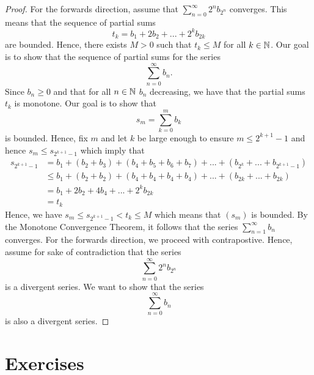 \begin{proof}
    For the forwards direction, assume that \( \sum_{n=0}^{ \infty} 2^n b_{2^n}\) converges. This means that the sequence of partial sums 
    \[ t_k = b_1 + 2b_2 + ... + 2^k b_{2k}\] are bounded. Hence, there exists \( M > 0 \) such that \( t_k \leq M \) for all \( k \in \mathbb{N} \). Our goal is to show that the sequence of partial sums for the series 
    \[ \sum_{n=0}^{ \infty} b_n.\] 
     Since \( b_n \geq 0 \) and that for all \( n \in \mathbb{N} \) \( b_n \) decreasing, we have that the partial sums \( t_k \) is monotone. Our goal is to show that 
     \[ s_m = \sum_{k=0}^{m} b_k  \]
     is bounded. Hence, fix \( m\) and let \( k \) be large enough to ensure \( m \leq 2^{k+1} - 1\) and hence \( s_m \leq s_{2^{k+1} - 1}\) which imply that 
     \begin{align*}
         s_{2^{k+1}-1}&= b_1 + (b_2 + b_3) + (b_4 + b_5 + b_6 + b_7 ) + ... + (b_{2^k} + ... + b_{2^{k+1}-1})\\ 
                      &\leq b_1 + (b_2 + b_2) + (b_4 + b_4 + b_4 + b_4) + ... + (b_{2k} + ... + b_{2k}) \\
                      &= b_1 + 2b_2 + 4b_4 + ... + 2^k b_{2k} \\
                      &= t_k 
     \end{align*}
     Hence, we have \( s_m \leq s_{2^{k+1} - 1} < t_k \leq M \) which means that \( (s_m)\) is bounded. By the Monotone Convergence Theorem, it follows that the series \( \sum_{n=1}^{ \infty} b_n \) converges. 
     For the forwards direction, we proceed with contrapostive. Hence, assume for sake of contradiction that the series 
     \[ \sum_{n=0}^{ \infty} 2^n b_{2^n}\]
     is a divergent series. We want to show that the series 
     \[ \sum_{n=0}^{ \infty} b_n \]
     is also a divergent series.
\end{proof}

\section{Exercises}

